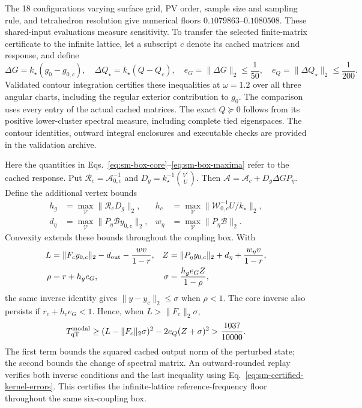 \documentclass[10pt,aps,pre,onecolumn,notitlepage,nofootinbib]{revtex4-2}
\newcommand{\qT}{\mathrm{qT}}
\begin{document}
The 18 configurations varying surface grid, PV order, sample size and sampling rule, and tetrahedron resolution give numerical floors $0.1079863$--$0.1080508$. These shared-input evaluations measure sensitivity. To transfer the selected finite-matrix certificate to the infinite lattice, let a subscript $c$ denote its cached matrices and response, and define
\begin{equation}
 \Delta G=k_\star(g_0-g_{0,c}),\quad
 \Delta Q_\star=k_\star(Q-Q_c),\quad
 e_G=\|\Delta G\|_2\leq\frac1{50},\quad
 e_Q=\|\Delta Q_\star\|_2\leq\frac1{200}.
 \label{eq:sm-certified-kernel-errors}
\end{equation}
Validated contour integration certifies these inequalities at $\omega=1.2$ over all three angular charts, including the regular exterior contribution to $g_0$. The comparison uses every entry of the actual cached matrices. The exact $Q\succeq0$ follows from its positive lower-cluster spectral measure, including complete tied eigenspaces. The contour identities, outward integral enclosures and executable checks are provided in the validation archive.

Here the quantities in Eqs.~\eqref{eq:sm-box-core}--\eqref{eq:sm-box-maxima} refer to the cached response. Put $\mathcal R_c=\mathcal A_{0,c}^{-1}$ and $D_g=k_\star^{-1}\binom{V^\dagger}{U}$. Then $\mathcal A=\mathcal A_c+D_g\Delta G P_\eta$. Define the additional vertex bounds
\begin{align}
 h_g&=\max_{\mathcal V}\|\mathcal R_cD_g\|_2,&
 h_c&=\max_{\mathcal V}\|\mathcal W_{0,c}^{-1}U/k_\star\|_2,\\
 d_\eta&=\max_{\mathcal V}\|P_\eta\mathcal B y_{0,c}\|_2,&
 w_\eta&=\max_{\mathcal V}\|P_\eta\mathcal B\|_2.
\end{align}
Convexity extends these bounds throughout the coupling box. With
\begin{align}
 L&=\|F_cy_{0,c}\|_2-d_{\rm out}-\frac{wv}{1-r},&
 Z&=\|P_\eta y_{0,c}\|_2+d_\eta+\frac{w_\eta v}{1-r},\\
 \rho&=r+h_ge_G,&
 \sigma&=\frac{h_ge_G Z}{1-\rho},
\end{align}
the same inverse identity gives $\|y-y_c\|_2\leq\sigma$ when $\rho<1$. The core inverse also persists if $r_c+h_ce_G<1$. Hence, when $L>\|F_c\|_2\sigma$,
\begin{equation}
 T_{\qT}^{\rm modal}\geq
 (L-\|F_c\|_2\sigma)^2-2e_Q(Z+\sigma)^2
 >\frac{1037}{10000}.
 \label{eq:sm-certified-lattice-floor}
\end{equation}
The first term bounds the squared cached output norm of the perturbed state; the second bounds the change of spectral matrix. An outward-rounded replay verifies both inverse conditions and the last inequality using Eq.~\eqref{eq:sm-certified-kernel-errors}. This certifies the infinite-lattice reference-frequency floor throughout the same six-coupling box.
\end{document}

